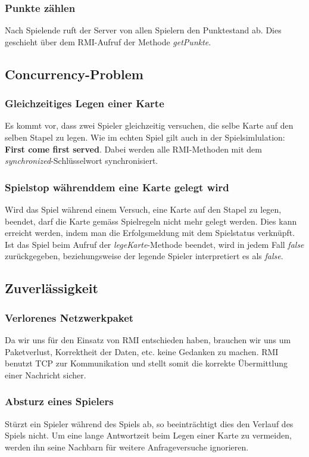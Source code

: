 \subsubsection{Punkte zählen}
Nach Spielende ruft der Server von allen Spielern den Punktestand ab. Dies geschieht über dem RMI-Aufruf der Methode \textit{getPunkte}.


\subsection{Concurrency-Problem}

\subsubsection{Gleichzeitiges Legen einer Karte}
Es kommt vor, dass zwei Spieler gleichzeitig versuchen, die selbe Karte auf den selben Stapel zu legen. Wie im echten Spiel gilt auch in der Spielsimlulation: \textbf{First come first served}. Dabei werden alle RMI-Methoden mit dem \textit{synchronized}-Schlüsselwort synchronisiert.

\subsubsection{Spielstop währenddem eine Karte gelegt wird}
Wird das Spiel während einem Versuch, eine Karte auf den Stapel zu legen, beendet, darf die Karte gemäss Spielregeln nicht mehr gelegt werden. Dies kann erreicht werden, indem man die Erfolgsmeldung mit dem Spielstatus verknüpft. Ist das Spiel beim Aufruf der \textit{legeKarte}-Methode beendet, wird in jedem Fall \textit{false} zurückgegeben, beziehungsweise der legende Spieler interpretiert es als \textit{false}.

\subsection{Zuverlässigkeit}

\subsubsection{Verlorenes Netzwerkpaket}
Da wir uns für den Einsatz von RMI entschieden haben, brauchen wir uns um Paketverlust, Korrektheit der Daten, etc. keine Gedanken zu machen. RMI benutzt TCP zur Kommunikation und stellt somit die korrekte Übermittlung einer Nachricht sicher.

\subsubsection{Absturz eines Spielers}
Stürzt ein Spieler während des Spiels ab, so beeinträchtigt dies den Verlauf des Spiels nicht. Um eine lange Antwortzeit beim Legen einer Karte zu vermeiden, werden ihn seine Nachbarn für weitere Anfrageversuche ignorieren.

